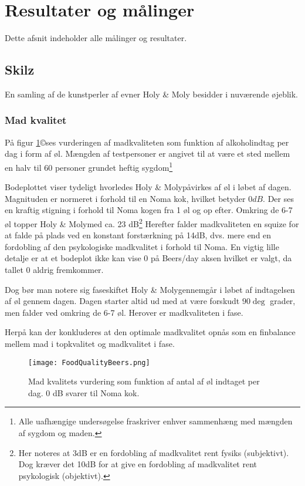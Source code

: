 \section{Resultater og målinger}
Dette afsnit indeholder alle målinger og resultater. 

\subsection{Skilz}
En samling af de kunstperler af evner Holy \& Moly \texttrademark besidder i nuværende øjeblik.

\subsubsection{Mad kvalitet}
På figur \ref{fig:FoodBeer}\copyright ses vurderingen af madkvaliteten som funktion af alkoholindtag per dag i form af øl. Mængden af testpersoner er angivet til at være et sted mellem en halv til 60 personer grundet heftig sygdom\footnote{Alle uafhængige undersøgelse fraskriver enhver sammenhæng med mængden af sygdom og maden.} 

Bodeplottet viser tydeligt hvorledes Holy \& Moly\texttrademark påvirkes af øl i løbet af dagen. Magnituden er normeret i forhold til en Noma kok, hvilket betyder $0dB$. Der ses en kraftig stigning i forhold til Noma kogen fra 1 øl og op efter. Omkring de 6-7 øl topper Holy \& Moly\texttrademark med ca. 23 dB\footnote{Her noteres at 3dB er en fordobling af madkvalitet rent fysiks (subjektivt). Dog kræver det 10dB for at give en fordobling af madkvalitet rent psykologisk (objektivt).} Herefter falder madkvaliteten en squize for at falde på plads ved en konstant forstærkning på 14dB, dvs. mere end en fordobling af den psykologiske madkvalitet i forhold til Noma.
En vigtig lille detalje er at et bodeplot ikke kan vise 0 på Beers/day aksen hvilket er valgt, da tallet 0 aldrig fremkommer. 

Dog bør man notere sig faseskiftet Holy \& Moly\texttrademark gennemgår i løbet af indtagelsen af øl gennem dagen. Dagen starter altid ud med at være forskudt $90 \deg$ grader, men falder ved omkring de 6-7 øl. Herover er madkvaliteten i fase.

Herpå kan der konkluderes at den optimale madkvalitet opnås som en finbalance mellem mad i topkvalitet og madkvalitet i fase.  

\begin{figure}[h!]
\centering
\texttt{[image: FoodQualityBeers.png]}
\caption{Mad kvalitets vurdering som funktion af antal af øl indtaget per dag. 0 dB svarer til Noma kok.}
\label{fig:FoodBeer}
\end{figure}


